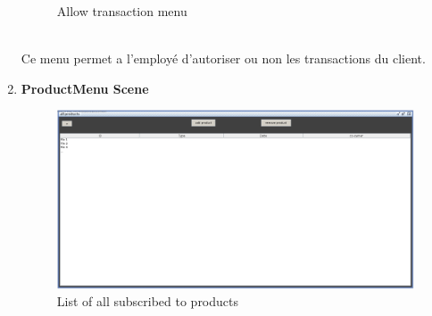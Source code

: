 \documentclass[../rapport.tex]{subfiles}
\begin{document}
\begin{enumerate}
\begin{figure}[h!]
				\caption{Allow transaction menu}
		\end{figure}
		\\
Ce menu permet a l'employé d'autoriser ou non les transactions du client.\\

\newpage
\item \textbf{ProductMenu Scene} \\
		\begin{figure}[h!]
				\centering \includegraphics[scale=0.2]{ressources/photos_diagrammes/app2/gui/productsMenuScene.jpg}
				\caption{List of all subscribed to products}
		\end{figure}


\end{enumerate}
\end{document}
